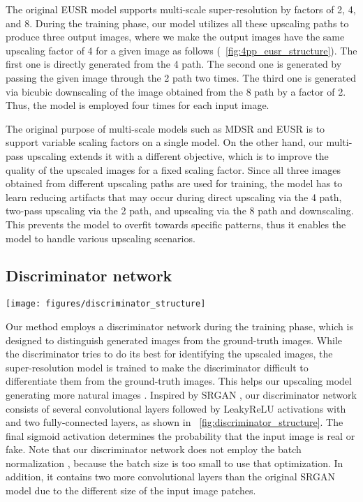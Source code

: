 \documentclass[runningheads]{llncs}
\begin{document}
The original EUSR model supports multi-scale super-resolution by factors of 2, 4, and 8.
During the training phase, our model utilizes all these upscaling paths to produce three output images, where we make the output images have the same upscaling factor of 4 for a given image as follows (\figurename~\ref{fig:4pp_eusr_structure}).
The first one is directly generated from the 4 path.
The second one is generated by passing the given image through the 2 path two times.
The third one is generated via bicubic downscaling of the image obtained from the 8 path by a factor of 2.
Thus, the model is employed four times for each input image.

The original purpose of multi-scale models such as MDSR \cite{lim2017enhanced} and EUSR \cite{kim2018deep} is to support variable scaling factors on a single model.
On the other hand, our multi-pass upscaling extends it with a different objective, which is to improve the quality of the upscaled images for a fixed scaling factor.
Since all three images obtained from different upscaling paths are used for training, the model has to learn reducing artifacts that may occur during direct upscaling via the 4 path, two-pass upscaling via the 2 path, and upscaling via the 8 path and downscaling.
This prevents the model to overfit towards specific patterns, thus it enables the model to handle various upscaling scenarios.


\subsection{Discriminator network}
\label{sec:discriminator}

\begin{figure*}[t]
	\centering
	\texttt{[image: figures/discriminator\_structure]}
	\caption{Structure of the discriminator network.}
	\label{fig:discriminator_structure}
\end{figure*}

Our method employs a discriminator network during the training phase, which is designed to distinguish generated images from the ground-truth images.
While the discriminator tries to do its best for identifying the upscaled images, the super-resolution model is trained to make the discriminator difficult to differentiate them from the ground-truth images.
This helps our upscaling model generating more natural images \cite{ledig2017photo,mechrez2018learning}.
Inspired by SRGAN \cite{ledig2017photo}, our discriminator network consists of several convolutional layers followed by LeakyReLU activations with  and two fully-connected layers, as shown in \figurename~\ref{fig:discriminator_structure}.
The final sigmoid activation determines the probability that the input image is real or fake.
Note that our discriminator network does not employ the batch normalization \cite{ioffe2015batch}, because the batch size is too small to use that optimization.
In addition, it contains two more convolutional layers than the original SRGAN model due to the different size of the input image patches.
\end{document}

